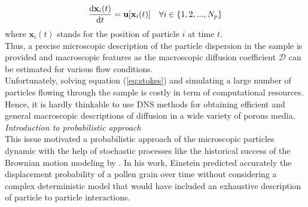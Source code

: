 \begin{equation}\label{eq:traject}
\dv{\textbf{x}_i(t)}{t}=\textbf{u}[\textbf{x}_i(t)]\quad\forall i\in\{1,2,...,N_p\}
\end{equation}
where $\textbf{x}_i(t)$ stands for the position of particle $i$ at time $t$.\\
Thus, a precise microscopic description of the particle dispersion in the sample is provided and macroscopic features as the macroscopic diffusion coefficient $\mathcal{D}$ can be estimated for various flow conditions.\\
Unfortunately, solving equation (\ref{eq:stokes}) and simulating a large number of particles flowing through the sample is costly in term of computational resources. Hence, it is hardly thinkable to use DNS methods for obtaining efficient and general macroscopic descriptions of diffusion in a wide variety of porous media.\\
\textit{Introduction to probabilistic approach}\\
This issue motivated a probabilistic approach of the microscopic particles dynamic with the help of stochastic processes like the historical success of the Brownian motion modeling by \citet{Einstein1906}. 
In his work, Einstein predicted accurately the displacement probability of a pollen grain over time without considering a complex deterministic model that would have included an exhaustive description of particle to particle interactions.\\

